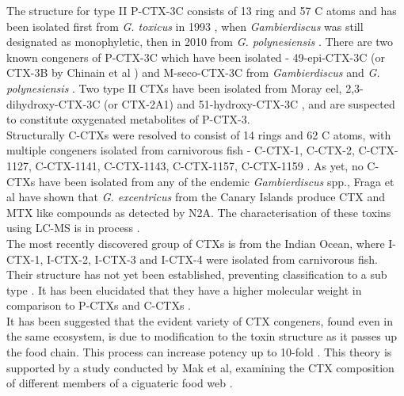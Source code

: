 \documentclass[12pt]{article}
\begin{document}
The structure for type II P-CTX-3C consists of 13 ring and 57 C atoms and has been isolated first from \emph{G. toxicus} in 1993 \cite{satake1993structure}, when \emph{Gambierdiscus} was still designated as monophyletic, then in 2010 from \emph{G. polynesiensis} \cite{chinain2010growth}. There are two known congeners of P-CTX-3C which have been isolated - 49-epi-CTX-3C (or CTX-3B by Chinain et al \cite{chinain2010growth}) and M-seco-CTX-3C from \emph{Gambierdiscus} \cite{satake1993structure} and \emph{G. polynesiensis} \cite{chinain2010growth}. Two type II CTXs have been isolated from Moray eel, 2,3-dihydroxy-CTX-3C (or CTX-2A1) and 51-hydroxy-CTX-3C \cite{satake1998isolation}, and are suspected to constitute oxygenated metabolites of P-CTX-3. \\ %

Structurally C-CTXs were resolved to consist of 14 rings and 62 C atoms, with multiple congeners isolated from carnivorous fish - C-CTX-1, C-CTX-2, C-CTX-1127, C-CTX-1141, C-CTX-1143, C-CTX-1157, C-CTX-1159 \cite{vernoux1997isolation,lewis1998structure,pottier2003identification,pottier2002characterisation}. As yet, no C-CTXs have been isolated from any of the endemic \emph{Gambierdiscus} spp., Fraga et al have shown that \emph{G. excentricus} from the Canary Islands produce CTX and MTX like compounds as detected by N2A. The characterisation of these toxins using LC-MS is in process \cite{fraga2011gambierdiscus}. \\

The most recently discovered group of CTXs is from the Indian Ocean, where I-CTX-1, I-CTX-2, I-CTX-3 and I-CTX-4 were isolated from carnivorous fish. Their structure has not yet been established, preventing classification to a sub type \cite{hamilton2002multiple,hamilton2002isolation}. It has been elucidated that they have a higher molecular weight in comparison to P-CTXs and C-CTXs \cite{caillaud2010update,hamilton2002multiple,hamilton2002isolation}. \\ %

It has been suggested that the evident variety of CTX congeners, found even in the same ecosystem, is due to modification to the toxin structure as it passes up the food chain. This process can increase potency up to 10-fold \cite{hokama1996human,lewis2006ciguatera}. This theory is supported by a study conducted by Mak et al, examining the CTX composition of different members of a ciguateric food web \cite{mak2013pacific}.
\end{document}
